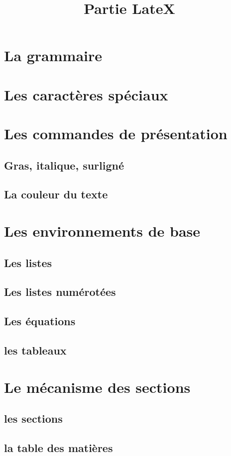 \documentclass[10pt,a4paper]{report}
\begin{document}
\title{Partie LateX}


\tableofcontents

\section{La grammaire}

\section{Les caractères spéciaux}

\section{Les commandes de présentation}
\subsection{Gras, italique, surligné}
\subsection{La couleur du texte}

\section{Les environnements de base}
\subsection{Les listes}
\subsection{Les listes numérotées}
\subsection{Les équations}
\subsection{les tableaux}

\section{Le mécanisme des sections}
\subsection{les sections}
\subsection{la table des matières}
\end{document}
